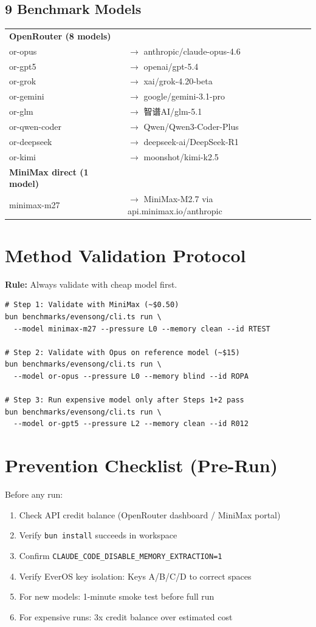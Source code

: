 \documentclass[11pt,a4paper]{article}
\begin{document}
\subsection{9 Benchmark Models}
\begin{tabular}{ll}
\textbf{OpenRouter (8 models)} & \\
or-opus    & $\rightarrow$ anthropic/claude-opus-4.6 \\
or-gpt5    & $\rightarrow$ openai/gpt-5.4 \\
or-grok    & $\rightarrow$ xai/grok-4.20-beta \\
or-gemini  & $\rightarrow$ google/gemini-3.1-pro \\
or-glm     & $\rightarrow$ 智谱AI/glm-5.1 \\
or-qwen-coder & $\rightarrow$ Qwen/Qwen3-Coder-Plus \\
or-deepseek & $\rightarrow$ deepseek-ai/DeepSeek-R1 \\
or-kimi    & $\rightarrow$ moonshot/kimi-k2.5 \\[6pt]
\textbf{MiniMax direct (1 model)} & \\
minimax-m27 & $\rightarrow$ MiniMax-M2.7 via api.minimax.io/anthropic
\end{tabular}

\section{Method Validation Protocol}

\textbf{Rule:} Always validate with cheap model first.

\begin{verbatim}
# Step 1: Validate with MiniMax (~$0.50)
bun benchmarks/evensong/cli.ts run \
  --model minimax-m27 --pressure L0 --memory clean --id RTEST

# Step 2: Validate with Opus on reference model (~$15)
bun benchmarks/evensong/cli.ts run \
  --model or-opus --pressure L0 --memory blind --id ROPA

# Step 3: Run expensive model only after Steps 1+2 pass
bun benchmarks/evensong/cli.ts run \
  --model or-gpt5 --pressure L2 --memory clean --id R012
\end{verbatim}

\section{Prevention Checklist (Pre-Run)}

Before any run:
\begin{enumerate}
  \item Check API credit balance (OpenRouter dashboard / MiniMax portal)
  \item Verify \texttt{bun install} succeeds in workspace
  \item Confirm \texttt{CLAUDE\_CODE\_DISABLE\_MEMORY\_EXTRACTION=1}
  \item Verify EverOS key isolation: Keys A/B/C/D to correct spaces
  \item For new models: 1-minute smoke test before full run
  \item For expensive runs: 3x credit balance over estimated cost
\end{enumerate}
\end{document}

